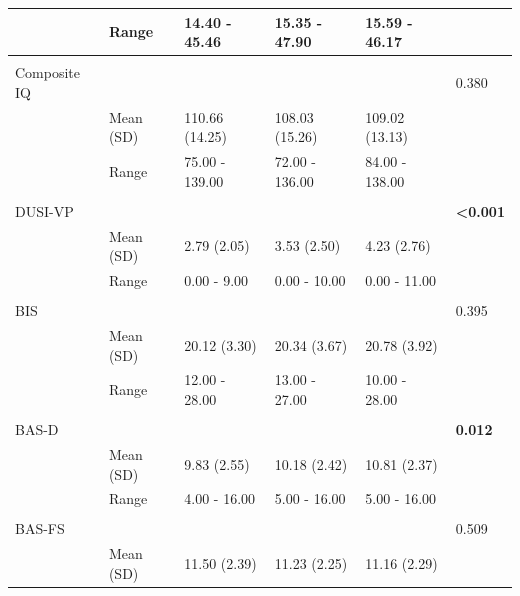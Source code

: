 \documentclass[utf8]{frontiersSCNS} %
\begin{document}
\begin{table}[h!]
\begin{tabular}{llllll}
                    & Range           & 14.40 - 45.46  & 15.35 - 47.90  & 15.59 - 46.17  &                          \\ \hline \\
Composite IQ        &                 &                  &                  &                  & 0.380                    \\
                    & Mean (SD)       & 110.66 (14.25) & 108.03 (15.26) & 109.02 (13.13) &                          \\
                    & Range           & 75.00 - 139.00 & 72.00 - 136.00 & 84.00 - 138.00 &                          \\ \hline \\
DUSI-VP    &                 &                  &                  &                  & \textbf{\textless 0.001} \\
                    & Mean (SD)       & 2.79 (2.05)    & 3.53 (2.50)    & 4.23 (2.76)    &                          \\
                    & Range           & 0.00 - 9.00    & 0.00 - 10.00   & 0.00 - 11.00   &                          \\ \hline \\
BIS                 &                 &                  &                  &                  & 0.395                    \\
                    & Mean (SD)       & 20.12 (3.30)   & 20.34 (3.67)   & 20.78 (3.92)   &                          \\
                    & Range           & 12.00 - 28.00  & 13.00 - 27.00  & 10.00 - 28.00  &                          \\ \hline \\
BAS-D &                 &                  &                  &                  & \textbf{0.012}           \\
                    & Mean (SD)       & 9.83 (2.55)    & 10.18 (2.42)   & 10.81 (2.37)   &                          \\
                    & Range           & 4.00 - 16.00   & 5.00 - 16.00   & 5.00 - 16.00   &                          \\ \hline \\
BAS-FS     &                 &                  &                  &                  & 0.509                    \\
                    & Mean (SD)       & 11.50 (2.39)   & 11.23 (2.25)   & 11.16 (2.29)   &                          \\

\end{tabular}
\end{table}
\end{document}

